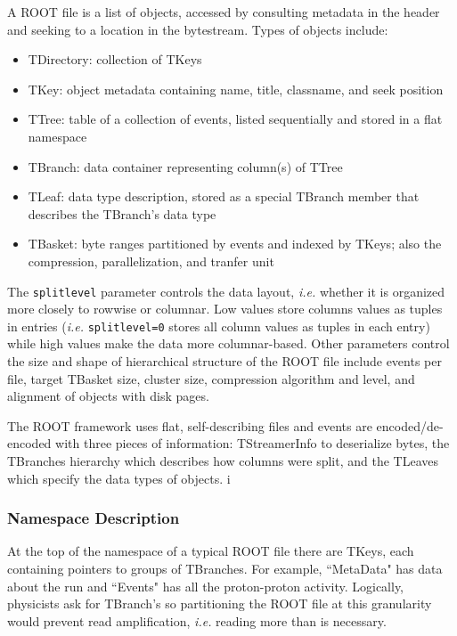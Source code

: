 A ROOT file is a list of objects, accessed by consulting metadata in the
header and seeking to a location in the bytestream. Types of objects include: 

\begin{itemize}

  \item TDirectory: collection of TKeys

  \item TKey: object metadata containing name, title, classname, and seek
  position

  \item TTree: table of a collection of events, listed sequentially and stored in a flat namespace

  \item TBranch: data container representing column(s) of TTree

  \item TLeaf: data type description, stored as a special TBranch member
  that describes the TBranch's data type

  \item TBasket: byte ranges partitioned by events and indexed by TKeys;
  also the compression, parallelization, and tranfer unit

\end{itemize}

The \texttt{splitlevel} parameter controls the data layout, {\it i.e.}
whether it is organized more closely to rowwise or columnar. Low values
store columns values as tuples in entries ({\it i.e.} \texttt{splitlevel=0}
stores all column values as tuples in each entry) while high values make
the data more columnar-based. Other parameters control the size and shape
of hierarchical structure of the ROOT file include events per file, target
TBasket size, cluster size, compression algorithm and level, and alignment
of objects with disk pages.

The ROOT framework uses flat, self-describing files and events are
encoded/de-encoded with three pieces of information: TStreamerInfo to
deserialize bytes, the TBranches hierarchy which describes how columns were
split, and the TLeaves which specify the data types of objects. i

\subsubsection{Namespace Description}

At the top of the namespace of a typical ROOT file there are TKeys, each
containing pointers to groups of TBranches. For example, ``MetaData" has data
about the run and ``Events" has all the proton-proton activity. Logically,
physicists ask for TBranch's so partitioning the ROOT file at this granularity
would prevent read amplification, {\it i.e.} reading more than is necessary.

